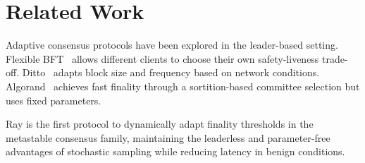 \section{Related Work}

\label{sec:related}

Adaptive consensus protocols have been explored in the leader-based setting.
Flexible BFT~\cite{malkhi2019flexible} allows different clients to choose their own
safety-liveness trade-off. Ditto~\cite{gelashvili2022ditto} adapts block size and
frequency based on network conditions. Algorand~\cite{gilad2017algorand} achieves
fast finality through a sortition-based committee selection but uses fixed parameters.

Ray is the first protocol to dynamically adapt finality thresholds in the metastable
consensus family, maintaining the leaderless and parameter-free advantages of
stochastic sampling while reducing latency in benign conditions.

